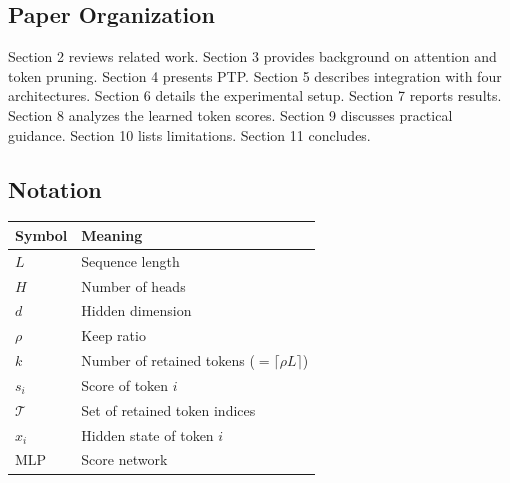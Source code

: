 \subsection{Paper Organization}

Section 2 reviews related work. Section 3 provides background on attention 
and token pruning. Section 4 presents PTP. Section 5 describes integration 
with four architectures. Section 6 details the experimental setup. Section 
7 reports results. Section 8 analyzes the learned token scores. Section 9 
discusses practical guidance. Section 10 lists limitations. Section 11 
concludes.



\subsection{Notation}

\begin{table}[H]
\centering
\small
\begin{tabular}{ll}
\toprule
\textbf{Symbol} & \textbf{Meaning} \\
\midrule
$L$ & Sequence length \\
$H$ & Number of heads \\
$d$ & Hidden dimension \\
$\rho$ & Keep ratio \\
$k$ & Number of retained tokens ($= \lceil \rho L \rceil$) \\
$s_i$ & Score of token $i$ \\
$\mathcal{T}$ & Set of retained token indices \\
$x_i$ & Hidden state of token $i$ \\
$\text{MLP}$ & Score network \\
\bottomrule
\end{tabular}
\end{table}

